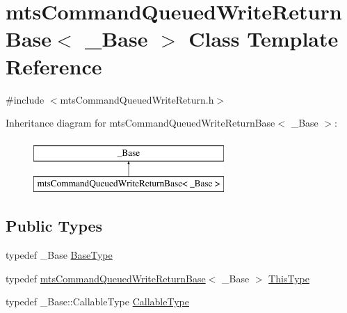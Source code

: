 \hypertarget{classmts_command_queued_write_return_base}{}\section{mts\+Command\+Queued\+Write\+Return\+Base$<$ \+\_\+\+Base $>$ Class Template Reference}
\label{classmts_command_queued_write_return_base}


{\ttfamily \#include $<$mts\+Command\+Queued\+Write\+Return.\+h$>$}

Inheritance diagram for mts\+Command\+Queued\+Write\+Return\+Base$<$ \+\_\+\+Base $>$\+:\begin{figure}[H]
\begin{center}
\leavevmode
\includegraphics[height=2.000000cm]{db/d04/classmts_command_queued_write_return_base}
\end{center}
\end{figure}
\subsection*{Public Types}
\begin{DoxyCompactItemize}
\item 
typedef \+\_\+\+Base \hyperlink{classmts_command_queued_write_return_base_a1c16e3d09d9bb0071bb50f31ba81b4a8}{Base\+Type}
\item 
typedef \hyperlink{classmts_command_queued_write_return_base}{mts\+Command\+Queued\+Write\+Return\+Base}$<$ \+\_\+\+Base $>$ \hyperlink{classmts_command_queued_write_return_base_af2f07528dc98cd88ab385e995f95a368}{This\+Type}
\item 
typedef \+\_\+\+Base\+::\+Callable\+Type \hyperlink{classmts_command_queued_write_return_base_aa8635b9bab77a8e15f53f9f80415c420}{Callable\+Type}
\end{DoxyCompactItemize}
